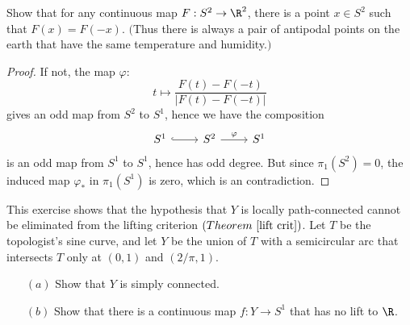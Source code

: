 \begin{exercise}
Show that for any continuous map $F:S^2\to\R^2$, there is a point $x\in S^2$ such that $F(x)=F(-x)$. $($Thus there is always a pair of antipodal points on the earth that have the same temperature and humidity.$)$
\end{exercise}
\begin{proof}
If not, the map $\varphi$:
\[t\mapsto\dfrac{F(t)-F(-t)}{|F(t)-F(-t)|}\]
gives an odd map from $S^2$ to $S^1$, hence we have the composition
\[\begin{tikzcd}
S^1\ar[r,hook]&S^2\ar[r,"\varphi"]&S^1
\end{tikzcd}\]
is an odd map from $S^1$ to $S^1$, hence has odd degree. But since $\pi_1(S^2)=0$, the induced map $\varphi_*$ in $\pi_1(S^1)$ is zero, which is an contradiction.
\end{proof}
\begin{exercise}\label{counter lift crit}
This exercise shows that the hypothesis that $Y$ is locally path-connected cannot be eliminated from the lifting criterion $(Theorem~\ref{lift crit})$. Let $T$ be the topologist's sine curve, and let $Y$ be the union of $T$ with a semicircular arc that intersects $T$ only at $(0,1)$ and $(2/\pi,1)$.
\begin{itemize}
\item[$(a)$] Show that $Y$ is simply connected.
\item[$(b)$] Show that there is a continuous map $f:Y\to S^1$ that has no lift to $\R$.
\end{itemize}
\end{exercise}
